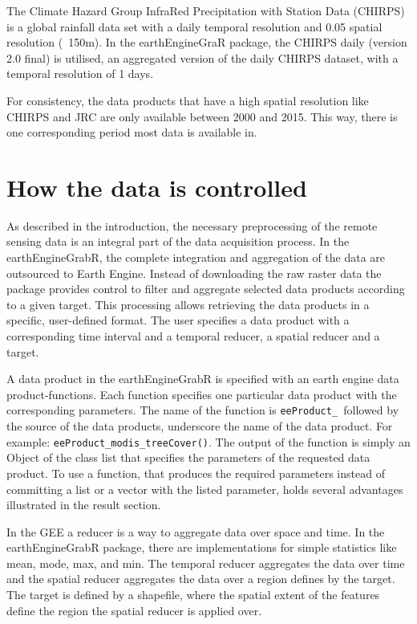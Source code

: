 The Climate Hazard Group InfraRed Precipitation with Station Data (CHIRPS) is a global rainfall data set with a daily temporal resolution and 0.05 spatial resolution (~150m). In the earthEngineGraR package, the CHIRPS daily (version 2.0 final) is utilised, an aggregated version of the daily CHIRPS dataset, with a temporal resolution of 1 days.

For consistency, the data products that have a high spatial resolution like CHIRPS and JRC are only available between 2000 and 2015. This way, there is one corresponding period most data is available in.

\section{How the data is controlled}

As described in the introduction, the necessary preprocessing of the remote sensing data is an integral part of the data acquisition process. In the earthEngineGrabR, the complete integration and aggregation of the data are outsourced to Earth Engine.
Instead of downloading the raw raster data the package provides control to filter and aggregate selected data products according to a given target. This processing allows retrieving the data products in a specific, user-defined format. The user specifies a data product with a corresponding time interval and a temporal reducer, a spatial reducer and a target. 

A data product in the earthEngineGrabR is specified with an earth engine data product-functions. Each function specifies one particular data product with the corresponding parameters. The name of the function is \texttt{eeProduct\_ }followed by the source of the data products, underscore the name of the data product. For example: \texttt{eeProduct\_modis\_treeCover()}. The output of the function is simply an Object of the class list that specifies the parameters of the requested data product. To use a function, that produces the required parameters instead of committing a list or a vector with the listed parameter, holds several advantages illustrated in the result section.

In the GEE a reducer is a way to aggregate data over space and time. In the earthEngineGrabR package, there are implementations for simple statistics like mean, mode, max, and min. The temporal reducer aggregates the data over time and the spatial reducer aggregates the data over a region defines by the target. 
The target is defined by a shapefile, where the spatial extent of the features define the region the spatial reducer is applied over.

